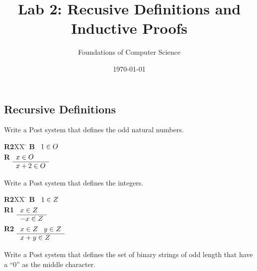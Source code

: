 \documentclass[]{exam}
\title{Lab 2: Recusive Definitions and Inductive Proofs}
\author{Foundations of Computer Science}
\date{\today}
\theoremstyle{definition}
\begin{document}
\maketitle

\begin{questions}

\section*{Recursive Definitions}
\question Write a Post system that defines the odd natural numbers.

\begin{tabbing}
{\bf R2}XX \=  \kill
{\bf B} \>
        \(\begin{array}[t]{l}
        1\in O
        \end{array}\) \\[2ex]
{\bf R} \>
        \(\begin{array}[t]{l}
        x \in O \\
        \hline
        x + 2 \in O
        \end{array}\)
\end{tabbing}

\question Write a Post system that defines the integers.
\begin{tabbing}
{\bf R2}XX \=  \kill
{\bf B} \>
        \(\begin{array}[t]{l}
        1\in Z
        \end{array}\) \\[2ex]
{\bf R1} \>
        \(\begin{array}[t]{l}
        x \in Z \\
        \hline
        -x \in Z
        \end{array}\) \\[2ex]
{\bf R2} \>
        \(\begin{array}[t]{l}
        x \in Z \;\;\;y \in Z \\
        \hline
        x + y \in Z
        \end{array}\)
\end{tabbing}


\question Write a Post system that defines the set of binary strings of odd
length that have a ``0'' as the middle character.


\end{questions}
\end{document}

